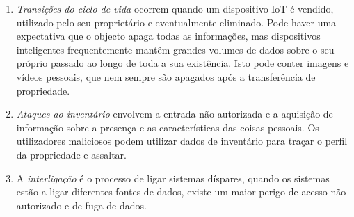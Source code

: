 \documentclass[conference]{IEEEtran}
\begin{document}
\begin{enumerate}
    \item
    \textit{Transições do ciclo de vida} ocorrem quando um dispositivo IoT é
    vendido, utilizado pelo seu proprietário e eventualmente eliminado. Pode
    haver uma expectativa que o objecto apaga todas as informações, mas dispositivos
    inteligentes frequentemente mantêm grandes volumes de dados sobre o seu próprio
    passado ao longo de toda a sua existência. Isto pode conter imagens e vídeos
    pessoais, que nem sempre são apagados após a transferência de propriedade.

    \item
    \textit{Ataques ao inventário} envolvem a entrada não autorizada e a aquisição
    de informação sobre a presença e as características das coisas pessoais. Os
    utilizadores maliciosos podem utilizar dados de inventário para traçar o perfil
    da propriedade e assaltar.

    \item
    A \textit{interligação} é o processo de ligar sistemas díspares, quando
    os sistemas estão a ligar diferentes fontes de dados, existe um maior perigo
    de acesso não autorizado e de fuga de dados.

\end{enumerate}
\end{document}
